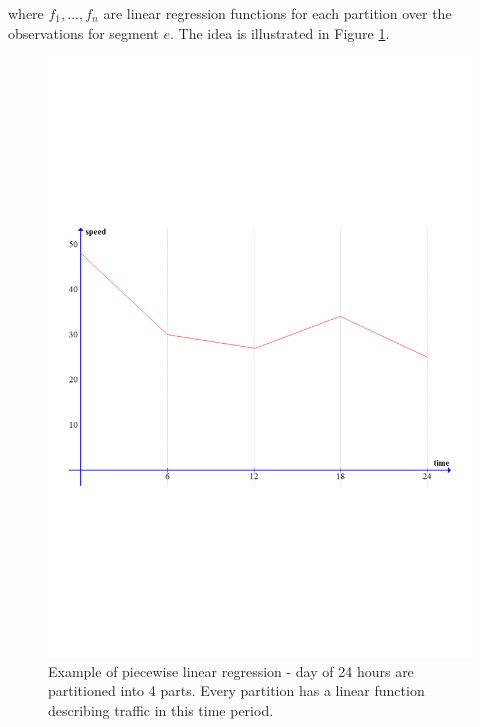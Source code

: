 where $f_1,...,f_n$ are linear regression functions for each partition over the observations for segment $e$. The idea is illustrated in Figure \ref{fig:segmented-regression}.
\begin{figure}
\centering
\includegraphics[trim={0 8cm 0 9cm},clip, width=\textwidth]{figures/piecewise.pdf}
\caption{Example of piecewise linear regression - day of 24 hours are partitioned into 4 parts. Every partition has a linear function describing traffic in this time period.}
\label{fig:segmented-regression}
\end{figure}
